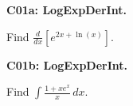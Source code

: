 \documentclass[12pt]{article}
\newcommand{\<}{\left\langle}
\renewcommand{\>}{\right\rangle}
\newcommand{\exerciseHeader}[4]{


  \vspace{0.5em}
  \textbf{#2}
  \vspace{0.5em}

}
\begin{document}
\begin{multicols}{2}

%
%
%
%

%
%
%
%

%

%

%

\exerciseHeader{2017 June 07}{C01a: LogExpDerInt.}{
Find derivatives and integrals involving logrithmic and exponential functions.
}{Extra}

Find \(\frac{d}{dx}[e^{2x+\ln(x)}]\).

\exerciseHeader{2017 June 07}{C01b: LogExpDerInt.}{
Find derivatives and integrals involving logrithmic and exponential functions.
}{Extra}

Find \(\int\frac{1+xe^x}{x}\,dx\).



%

%


\end{multicols}
\end{document}
